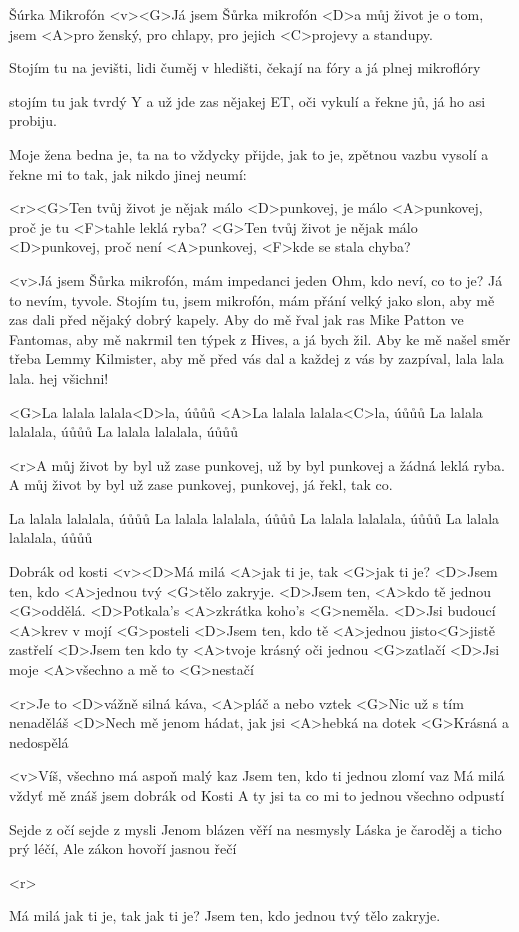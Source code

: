 \begin{song}{81}{Šúrka Mikrofón}{}
	<v><G>Já jsem Šůrka mikrofón
	<D>a můj život je o tom,
	jsem <A>pro ženský, pro chlapy,
	pro jejich <C>projevy a standupy.

	Stojím tu na jevišti,
	lidi čuměj v hledišti,
	čekají na fóry
	a já plnej mikroflóry

	stojím tu jak tvrdý Y
	a už jde zas nějakej ET,
	oči vykulí a řekne jů,
	já ho asi probiju.

	Moje žena bedna je,
	ta na to vždycky přijde, jak to je,
	zpětnou vazbu vysolí
	a řekne mi to tak, jak nikdo jinej neumí:

	<r><G>Ten tvůj život je nějak málo <D>punkovej,
	je málo <A>punkovej,
	proč je tu <F>tahle leklá ryba?
	<G>Ten tvůj život je nějak málo <D>punkovej,
	proč není <A>punkovej,
	<F>kde se stala chyba?

	<v>Já jsem Šůrka mikrofón,
	mám impedanci jeden Ohm,
	kdo neví, co to je?
	Já to nevím, tyvole.
	Stojím tu, jsem mikrofón,
	mám přání velký jako slon,
	aby mě zas dali
	před nějaký dobrý kapely.
	Aby do mě řval jak ras
	Mike Patton ve Fantomas,
	aby mě nakrmil
	ten týpek z Hives,
	a já bych žil.
	Aby ke mě našel směr
	třeba Lemmy Kilmister,
	aby mě před vás dal
	a každej z vás by zazpíval, lala lala lala.
	hej všichni!

	<G>La lalala lalala<D>la, úůůů
	<A>La lalala lalala<C>la, úůůů
	La lalala lalalala, úůůů
	La lalala lalalala, úůůů

	<r>A můj život by byl už zase punkovej,
	už by byl punkovej
	a žádná leklá ryba.
	A můj život by byl už zase punkovej,
	punkovej,
	já řekl, tak co.

	La lalala lalalala, úůůů
	La lalala lalalala, úůůů
	La lalala lalalala, úůůů
	La lalala lalalala, úůůů
\end{song}

\begin{song}[Chinaski]{82}{Dobrák od kosti}{}
	<v><D>Má milá <A>jak ti je, tak <G>jak ti je?
	<D>Jsem ten, kdo <A>jednou tvý <G>tělo zakryje.
	<D>Jsem ten, <A>kdo tě jednou <G>oddělá.
	<D>Potkala's <A>zkrátka koho's <G>neměla.
	<D>Jsi budoucí <A>krev v mojí <G>posteli
	<D>Jsem ten, kdo tě <A>jednou jisto<G>jistě zastřelí
	<D>Jsem ten kdo ty <A>tvoje krásný oči jednou <G>zatlačí
	<D>Jsi moje <A>všechno a mě to <G>nestačí

	<r>Je to <D>vážně silná káva, <A>pláč a nebo vztek
	<G>Nic už s tím nenaděláš
	<D>Nech mě jenom hádat, jak jsi <A>hebká na dotek
	<G>Krásná a nedospělá

	<v>Víš, všechno má aspoň malý kaz
	Jsem ten, kdo ti jednou zlomí vaz
	Má milá vždyť mě znáš jsem dobrák od Kosti
	A ty jsi ta co mi to jednou všechno odpustí

	Sejde z očí sejde z mysli
	Jenom blázen věří na nesmysly
	Láska je čaroděj a ticho prý léčí,
	Ale zákon hovoří jasnou řečí

	<r>

	Má milá jak ti je, tak jak ti je?
	Jsem ten, kdo jednou tvý tělo zakryje.
\end{song}

